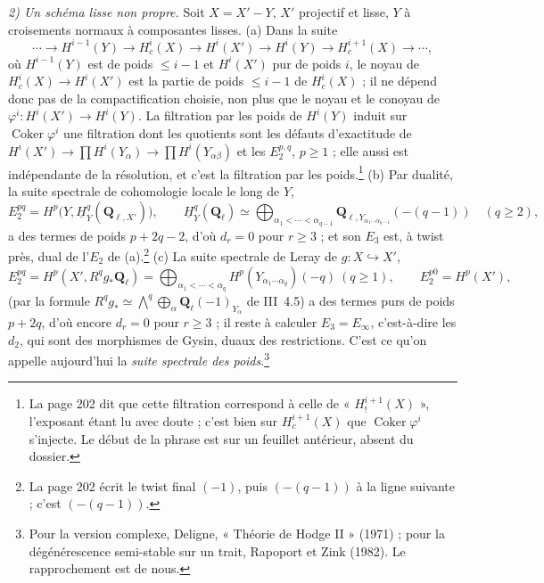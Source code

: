\documentclass[11pt,a4paper]{article}
\begin{document}
\emph{2) Un schéma lisse non propre.} Soit $X = X' - Y$, $X'$ projectif et lisse,
$Y$ à croisements normaux à composantes lisses. (a) Dans la suite
\[
  \cdots \to H^{i-1}(Y) \to H^i_c(X) \to H^i(X') \to H^i(Y) \to H^{i+1}_c(X) \to \cdots,
\]
où $H^{i-1}(Y)$ est de poids $\leq i-1$ et $H^i(X')$ pur de poids $i$, le noyau
de $H^i_c(X) \to H^i(X')$ est la partie de poids $\leq i - 1$ de $H^i_c(X)$ ; il ne
dépend donc pas de la compactification choisie, non plus que le noyau et le
conoyau de $\varphi^i : H^i(X') \to H^i(Y)$. La filtration par les poids de
$H^i(Y)$ induit sur $\operatorname{Coker}\varphi^i$ une filtration dont les
quotients sont les défauts d'exactitude de $H^i(X') \to \prod H^i(Y_\alpha) \to
\prod H^i(Y_{\alpha\beta})$ et les $E_2^{p,q}$, $p \geq 1$ ; elle aussi est
indépendante de la résolution, et c'est la filtration par les poids.\footnote{La
page 202 dit que cette filtration correspond à celle de « $H_!^{i+1}(X)$ »,
l'exposant étant lu avec doute ; c'est bien sur $H^{i+1}_c(X)$ que
$\operatorname{Coker}\varphi^i$ s'injecte. Le début de la phrase est sur un
feuillet antérieur, absent du dossier.} (b) Par dualité, la suite spectrale de
cohomologie locale le long de $Y$,
\[
  E_2^{pq} = H^p\bigl(Y, \underline H^q_Y(\mathbf{Q}_{\ell, X'})\bigr), \qquad
  \underline H^q_Y(\mathbf{Q}_\ell) \simeq \bigoplus_{\alpha_1 < \cdots < \alpha_{q-1}}
  \mathbf{Q}_{\ell, Y_{\alpha_1 \cdots \alpha_{q-1}}}(-(q-1)) \quad (q \geq 2),
\]
a des termes de poids $p + 2q - 2$, d'où $d_r = 0$ pour $r \geq 3$ ; et son
$E_3$ est, à twist près, dual de l'$E_2$ de (a).\footnote{La page 202 écrit le
twist final $(-1)$, puis $(-(q-1))$ à la ligne suivante ; c'est $(-(q-1))$.}
(c) La suite spectrale de Leray de $g : X \hookrightarrow X'$,
\[
  E_2^{pq} = H^p(X', R^q g_*\mathbf{Q}_\ell) =
  \bigoplus_{\alpha_1 < \cdots < \alpha_q} H^p(Y_{\alpha_1 \cdots \alpha_q})(-q)
  \ (q \geq 1), \qquad E_2^{p0} = H^p(X'),
\]
(par la formule $R^q g_* \simeq \bigwedge^q \bigoplus_\alpha
\mathbf{Q}_\ell(-1)_{Y_\alpha}$ de III~4.5) a des termes purs de poids
$p + 2q$, d'où encore $d_r = 0$ pour $r \geq 3$ ; il reste à calculer
$E_3 = E_\infty$, c'est-à-dire les $d_2$, qui sont des morphismes de Gysin,
duaux des restrictions. C'est ce qu'on appelle aujourd'hui la \emph{suite
spectrale des poids}.\footnote{Pour la version complexe, Deligne, « Théorie de
Hodge II » (1971) ; pour la dégénérescence semi-stable sur un trait,
Rapoport et Zink (1982). Le rapprochement est de nous.}
\end{document}
